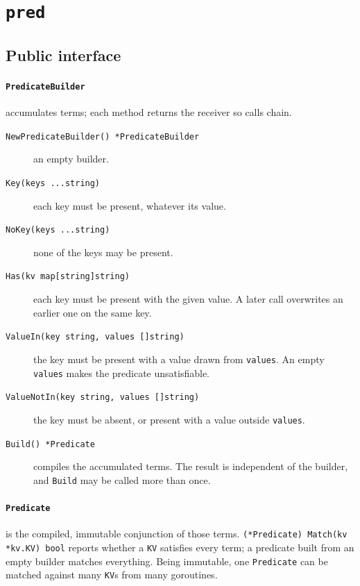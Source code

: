 \documentclass[11pt]{article}
\newcommand{\code}[1]{\texttt{#1}}
\begin{document}
\section{\code{pred}}

\subsection{Public interface}

\paragraph{\code{PredicateBuilder}} accumulates terms; each method returns the
receiver so calls chain.

\begingroup\sloppy
\begin{description}
  \item[\code{NewPredicateBuilder() *PredicateBuilder}] an empty builder.
  \item[\code{Key(keys ...string)}] each key must be present, whatever its value.
  \item[\code{NoKey(keys ...string)}] none of the keys may be present.
  \item[\code{Has(kv map[string]string)}] each key must be present with the
    given value. A later call overwrites an earlier one on the same key.
  \item[\code{ValueIn(key string, values []string)}] the key must be present
    with a value drawn from \code{values}. An empty \code{values} makes the
    predicate unsatisfiable.
  \item[\code{ValueNotIn(key string, values []string)}] the key must be absent,
    or present with a value outside \code{values}.
  \item[\code{Build() *Predicate}] compiles the accumulated terms. The result is
    independent of the builder, and \code{Build} may be called more than once.
\end{description}
\endgroup

\paragraph{\code{Predicate}} is the compiled, immutable conjunction of those
terms. \code{(*Predicate) Match(kv *kv.KV) bool} reports whether a \code{KV}
satisfies every term; a predicate built from an empty builder matches
everything. Being immutable, one \code{Predicate} can be matched against many
\code{KV}s from many goroutines.
\end{document}
